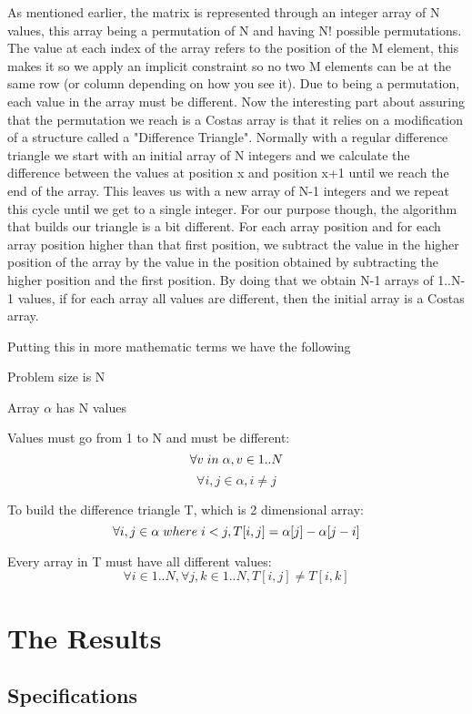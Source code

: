 \documentclass[runningheads]{llncs}
\begin{document}
As mentioned earlier, the matrix is represented through an integer array of N values, this array being a permutation of N and having N! possible permutations.
The value at each index of the array refers to the position of the M element, this makes it so we apply an implicit constraint so no two M elements can be at the same row (or column depending on how you see it).
Due to being a permutation, each value in the array must be different.
Now the interesting part about assuring that the permutation we reach is a Costas array is that it relies on a modification of a structure called a "Difference Triangle".
Normally with a regular difference triangle we start with an initial array of N integers and we calculate the difference between the values at position x and position x+1 until we reach the end of the array.
This leaves us with a new array of N-1 integers and we repeat this cycle until we get to a single integer.
For our purpose though, the algorithm that builds our triangle is a bit different.
For each array position and for each array position higher than that first position, we subtract the value in the higher position of the array by the value in the position obtained by subtracting the higher position and the first position.
By doing that we obtain N-1 arrays of 1..N-1 values, if for each array all values are different, then the initial array is a Costas array.


Putting this in more mathematic terms we have the following

Problem size is N

Array $\alpha$ has N values

Values must go from 1 to N and must be different: $$\forall v \hspace{0.1cm}  in \hspace{0.1cm} \alpha, v \in {1..N}$$ 
$$\forall i,j \in \alpha , i\ne j$$

To build the difference triangle T, which is 2 dimensional array: $$\forall i,j \in \alpha \hspace{0.1cm} where \hspace{0.1cm} i < j,  T[i,j] = \alpha[j] - \alpha[j-i]$$

Every array in T must have all different values: $$\forall i\in{1..N}, \forall j,k \in {1..N}, T[i,j] \ne T[i,k]$$

\section{The Results}
\subsection{Specifications}
\end{document}
